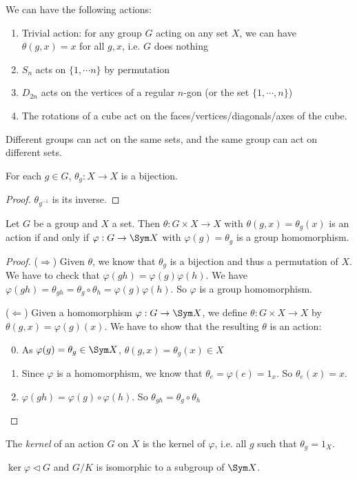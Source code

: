 \documentclass[a4pape]{article}
\begin{document}
\begin{eg}
  We can have the following actions:
  \begin{enumerate}
  \item Trivial action: for any group $G$ acting on any set $X$, we can have $\theta(g, x) = x$ for all $g, x$, i.e. $G$ does nothing
  \item $S_n$ acts on $\{1, \cdots n\}$ by permutation
  \item $D_{2n}$ acts on the vertices of a regular $n$-gon (or the set $\{1, \cdots, n\}$)
  \item The rotations of a cube act on the faces/vertices/diagonals/axes of the cube.
  \end{enumerate}
\end{eg}
\note Different groups can act on the same sets, and the same group can act on different sets.

\begin{lemma}
  For each $g\in G$, $\theta_g: X\to X$ is a bijection.
\end{lemma}

\begin{proof}
  $\theta_{g^{-1}}$ is its inverse.
\end{proof}

\begin{prop}
  Let $G$ be a group and $X$ a set. Then $\theta: G\times X\to X$ with $\theta(g, x) = \theta_g(x)$ is an action if and only if $\varphi: G\to \Sym X$ with $\varphi(g) = \theta_g$ is a group homomorphism.
\end{prop}

\begin{proof}
  ($\Rightarrow$) Given $\theta$, we know that $\theta_g$ is a bijection and thus a permutation of $X$. We have to check that $\varphi(gh) = \varphi(g)\varphi(h)$. We have $\varphi(gh) = \theta_{gh} = \theta_g\circ \theta_h = \varphi(g)\varphi(h)$. So $\varphi$ is a group homomorphism.

  ($\Leftarrow$) Given a homomorphism $\varphi: G\to \Sym X$, we define $\theta: G\times X\to X$ by $\theta(g, x) = \varphi(g)(x)$. We have to show that the resulting $\theta$ is an action:
  \begin{enumerate}[label=\arabic{*}.]
    \setcounter{enumi}{-1}
  \item As $\varphi(g) = \theta_g\in \Sym X$, $\theta(g, x) = \theta_g (x)\in X$
  \item Since $\varphi$ is a homomorphism, we know that $\theta_e  = \varphi(e) = 1_x$. So $\theta_e(x) = x$.
  \item $\varphi (gh) = \varphi(g)\circ \varphi(h)$. So $\theta_{gh} = \theta_g\circ \theta_h$
  \end{enumerate}
\end{proof}
\begin{defi}
  The \emph{kernel} of an action $G$ on $X$ is the kernel of $\varphi$, i.e. all $g$ such that $\theta_g = 1_X$.
\end{defi}
\note $\ker \varphi\lhd G$ and $G/K$ is isomorphic to a subgroup of $\Sym X$.
\end{document}
